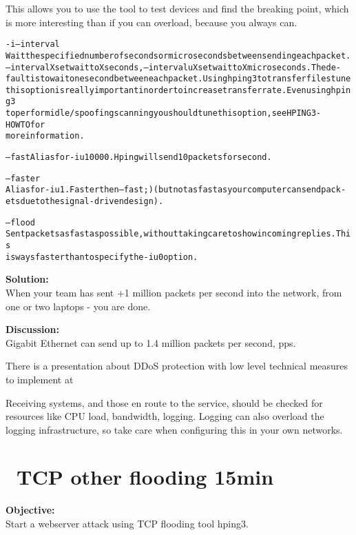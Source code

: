 \documentclass[a4paper,11pt,notitlepage]{report}
\begin{document}
This allows you to use the tool to test devices and find the breaking point, which is more interesting than if you can overload, because you always can.
\begin{alltt}\footnotesize
-i --interval
       Wait  the  specified  number  of  seconds or micro seconds between sending each packet.
       --interval X set wait to X seconds, --interval uX set wait to X micro seconds.  The de‐
       fault  is  to  wait one second between each packet. Using hping3 to transfer files tune
       this option is really important in order to increase transfer rate. Even  using  hping3
       to  perform  idle/spoofing  scanning  you should tune this option, see HPING3-HOWTO for
       more information.

--fast Alias for -i u10000. Hping will send 10 packets for second.

--faster
       Alias for -i u1. Faster then --fast ;) (but not as fast as your computer can send pack‐
       ets due to the signal-driven design).

--flood
       Sent  packets  as fast as possible, without taking care to show incoming replies.  This
       is ways faster than to specify the -i u0 option.
\end{alltt}

{\bf Solution:}\\
When your team has sent +1 million packets per second into the network, from one or two laptops - you are done.

{\bf Discussion:}\\
Gigabit Ethernet can send up to 1.4 million packets per second, pps.

There is a presentation about DDoS protection with low level technical measures to implement at\\
{\footnotesize {}}

Receiving systems, and those en route to the service, should be checked for resources like CPU load, bandwidth, logging. Logging can also overload the logging infrastructure, so take care when configuring this in your own networks.


\chapter{\faInfoCircle\ TCP other flooding 15min}


{\bf Objective:}\\
Start a webserver attack using TCP flooding tool hping3.
\end{document}
